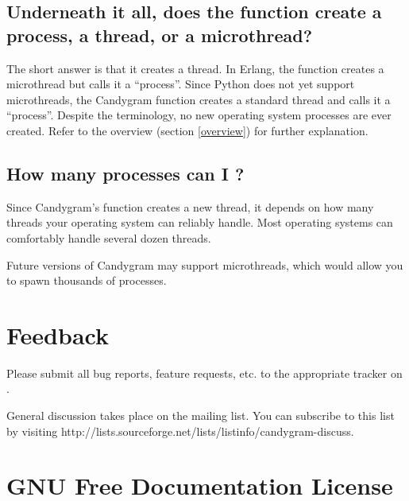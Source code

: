 \documentclass{howto}
\begin{document}
\subsection{Underneath it all, does the  function create a
process, a thread, or a microthread?}
The short answer is that it creates a thread. In Erlang, the 
function creates a microthread but calls it a ``process''. Since Python does not
yet support microthreads, the Candygram  function creates a
standard thread and calls it a ``process''. Despite the terminology, no new
operating system processes are ever created. Refer to the overview (section
\ref{overview}) for further explanation.

\subsection{How many processes can I ?}
Since Candygram's  function creates a new thread, it depends
on how many threads your operating system can reliably handle. Most operating
systems can comfortably handle several dozen threads.

Future versions of Candygram may support microthreads, which would allow you to
spawn thousands of processes.



\section{Feedback}

Please submit all bug reports, feature requests, etc. to the appropriate tracker
on .

General discussion takes place on the
 mailing list. You can subscribe
to this list by visiting 
	{http://lists.sourceforge.net/lists/listinfo/candygram-discuss}.



\appendix
\section{GNU Free Documentation License}
\label{fdl}





\end{document}
